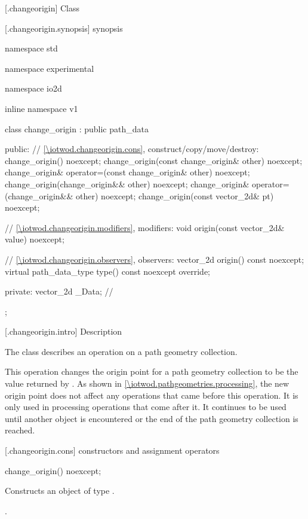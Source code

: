  [\iotwod.changeorigin] {Class }

 [\iotwod.changeorigin.synopsis] { synopsis}

\begin{codeblock}
namespace std { namespace experimental { namespace io2d { inline namespace v1 {
  class change_origin : public path_data {
  public:
    // \ref{\iotwod.changeorigin.cons}, construct/copy/move/destroy:
    change_origin() noexcept;
    change_origin(const change_origin& other) noexcept;
    change_origin& operator=(const change_origin& other) noexcept;
    change_origin(change_origin&& other) noexcept;
    change_origin& operator=(change_origin&& other) noexcept;
    change_origin(const vector_2d& pt) noexcept;

    // \ref{\iotwod.changeorigin.modifiers}, modifiers:
    void origin(const vector_2d& value) noexcept;

    // \ref{\iotwod.changeorigin.observers}, observers:
    vector_2d origin() const noexcept;
    virtual path_data_type type() const noexcept override;
    
  private:
    vector_2d _Data; // \expos
  };
} } } }
\end{codeblock}

 [\iotwod.changeorigin.intro] { Description}

\pnum
{}
The class  describes an operation on a path geometry collection.

\pnum
This operation changes the origin point for a path geometry collection to be the value returned by . As shown in \ref{\iotwod.pathgeometries.processing}, the new origin point does not affect any operations that came before this operation. It is only used in processing operations that come after it. It continues to be used until another  object is encountered or the end of the path geometry collection is reached.

 [\iotwod.changeorigin.cons] { constructors and assignment operators}

\begin{itemdecl}
    change_origin() noexcept;
\end{itemdecl}
\begin{itemdescr}
	\pnum
	\effects
	Constructs an object of type .
	
	\pnum
	\postconditions
	.
\end{itemdescr}

